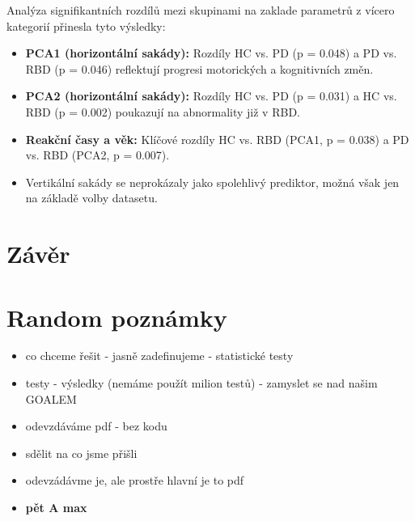 \documentclass{article}
\begin{document}
Analýza signifikantních rozdílů mezi skupinami na zaklade parametrů z vícero kategorií přinesla tyto výsledky:
\begin{itemize}

\item \textbf{PCA1 (horizontální sakády):} Rozdíly HC vs. PD (p = 0.048) a PD vs. RBD (p = 0.046) reflektují progresi motorických a kognitivních změn.
\item \textbf{PCA2 (horizontální sakády):} Rozdíly HC vs. PD (p = 0.031) a HC vs. RBD (p = 0.002) poukazují na abnormality již v RBD.
\item \textbf{Reakční časy a věk:} Klíčové rozdíly HC vs. RBD (PCA1, p = 0.038) a PD vs. RBD (PCA2, p = 0.007).
\item Vertikální sakády se neprokázaly jako spolehlivý prediktor, možná však jen na základě volby datasetu.
\end{itemize}


\section{Závěr}

\section{Random poznámky}
\begin{itemize}
    \item co chceme řešit - jasně zadefinujeme - statistické testy
    \item testy - výsledky (nemáme použít milion testů) - zamyslet se nad našim GOALEM
    \item odevzdáváme pdf - bez kodu
    \item sdělit na co jsme přišli
    \item odevzádávme je, ale prostře hlavní je to pdf
    \item \textbf{pět A max}
\end{itemize}



\end{document}
